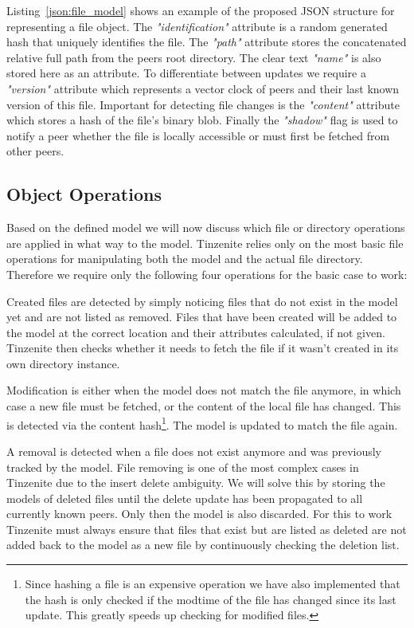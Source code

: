 Listing~\ref{json:file_model} shows an example of the proposed JSON structure for representing a file object.
The \textit{"identification"} attribute is a random generated hash that uniquely identifies the file.
The \textit{"path"} attribute stores the concatenated relative full path from the peers root directory.
The clear text \textit{"name"} is also stored here as an attribute.
To differentiate between updates we require a \textit{"version"} attribute which represents a vector clock of peers and their last known version of this file.
Important for detecting file changes is the \textit{"content"} attribute which stores a hash of the file's binary blob.
Finally the \textit{"shadow"} flag is used to notify a peer whether the file is locally accessible or must first be fetched from other peers.

\subsection{Object Operations}
\label{sub:Object Operations}

Based on the defined model we will now discuss which file or directory operations are applied in what way to the model.
Tinzenite relies only on the most basic file operations for manipulating both the model and the actual file directory.
Therefore we require only the following four operations for the basic case to work:

\begin{description}[leftmargin=5em,style=nextline,noitemsep,nolistsep]
    \item[Create]
        Created files are detected by simply noticing files that do not exist in the model yet and are not listed as removed.
        Files that have been created will be added to the model at the correct location and their attributes calculated, if not given.
        Tinzenite then checks whether it needs to fetch the file if it wasn't created in its own directory instance.
    \item[Modify]
        Modification is either when the model does not match the file anymore, in which case a new file must be fetched, or the content of the local file has changed.
        This is detected via the content hash\footnote{Since hashing a file is an expensive operation we have also implemented that the hash is only checked if the modtime of the file has changed since its last update. This greatly speeds up checking for modified files.}.
        The model is updated to match the file again.
    \item[Remove]
        A removal is detected when a file does not exist anymore and was previously tracked by the model.
        File removing is one of the most complex cases in Tinzenite due to the insert delete ambiguity.
        We will solve this by storing the models of deleted files until the delete update has been propagated to all currently known peers.
        Only then the model is also discarded.
        For this to work Tinzenite must always ensure that files that exist but are listed as deleted are not added back to the model as a new file by continuously checking the deletion list.
\end{description}

